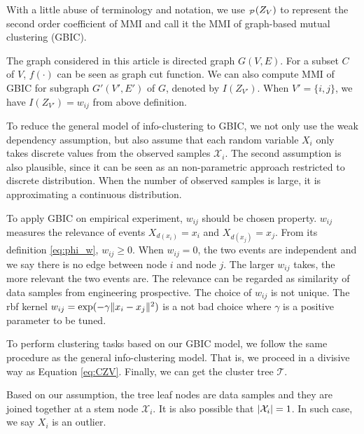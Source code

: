 With a little abuse of terminology and notation, we use $_{\P}(Z_V)$ to represent the second order coefficient of MMI and call it the MMI of graph-based mutual clustering (GBIC). 

The graph considered in this article is directed graph
$G(V, E)$. For a subset $C$ of $V$, $f(\cdot)$ can be seen as graph cut function. We can also compute MMI of GBIC for subgraph $G'(V',E')$ of $G$, denoted by $I(Z_{V'})$. When $V'=\{i,j\}$, we have $I(Z_{V'})=w_{ij}$ from above definition.

To reduce the general model of info-clustering to GBIC, we not only use the weak dependency assumption, but also assume that each random variable $X_i$ only takes discrete values from the observed samples $\mathcal{X}_i$. The second assumption is also plausible, since it can be seen as an non-parametric approach restricted to discrete distribution. When the number of observed samples is large, it is approximating a continuous distribution.

To apply GBIC on empirical experiment, $w_{ij}$ should be chosen property. $w_{ij}$ measures the relevance of events $X_{d(x_i)} = x_i$
and $X_{d(x_j)} = x_j$. 
From its definition \eqref{eq:phi_w}, $w_{ij} \geq 0$. When $w_{ij} = 0$, the two events are independent and we say there is no edge between
node $i$ and node $j$. The larger $w_{ij}$ takes, the more relevant the two events are. The relevance can be regarded as similarity of data samples 
from engineering prospective. The choice of $w_{ij}$ is not unique. The rbf kernel $w_{ij} = \exp(-\gamma \norm{x_i - x_j}^2)$ is a not bad choice
where $\gamma$ is a positive parameter to be tuned.

To perform clustering tasks based on our GBIC model, we follow the same procedure as the general info-clustering model. That is, we proceed in a divisive way as Equation \eqref{eq:CZV}. Finally, we can get the cluster tree $\mathcal{T}$.

Based on our assumption, the tree leaf nodes are data samples and they are joined together at a stem node $\mathcal{X}_i$. It is also possible that $\abs{\mathcal{X}_i} = 1$. In such case, we say $X_i$ is an outlier.


